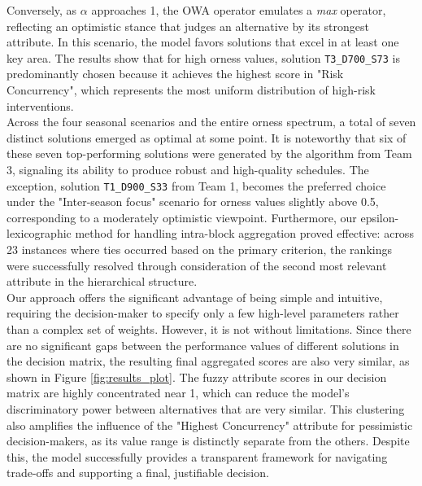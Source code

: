Conversely, as $\alpha$ approaches 1, the OWA operator emulates a \textit{max} operator, reflecting an optimistic stance that judges an alternative by its strongest attribute. In this scenario, the model favors solutions that excel in at least one key area. The results show that for high orness values, solution \texttt{T3\_D700\_S73} is predominantly chosen because it achieves the highest score in "Risk Concurrency", which represents the most uniform distribution of high-risk interventions.\\

Across the four seasonal scenarios and the entire orness spectrum, a total of seven distinct solutions emerged as optimal at some point. It is noteworthy that six of these seven top-performing solutions were generated by the algorithm from Team 3, signaling its ability to produce robust and high-quality schedules. The exception, solution \texttt{T1\_D900\_S33} from Team 1, becomes the preferred choice under the "Inter-season focus" scenario for orness values slightly above 0.5, corresponding to a moderately optimistic viewpoint. Furthermore, our epsilon-lexicographic method for handling intra-block aggregation proved effective: across 23 instances where ties occurred based on the primary criterion, the rankings were successfully resolved through consideration of the second most relevant attribute in the hierarchical structure.\\

Our approach offers the significant advantage of being simple and intuitive, requiring the decision-maker to specify only a few high-level parameters rather than a complex set of weights. However, it is not without limitations. Since there are no significant gaps between the performance values of different solutions in the decision matrix, the resulting final aggregated scores are also very similar, as shown in Figure \ref{fig:results_plot}. The fuzzy attribute scores in our decision matrix are highly concentrated near 1, which can reduce the model's discriminatory power between alternatives that are very similar. This clustering also amplifies the influence of the "Highest Concurrency" attribute for pessimistic decision-makers, as its value range is distinctly separate from the others. Despite this, the model successfully provides a transparent framework for navigating trade-offs and supporting a final, justifiable decision.